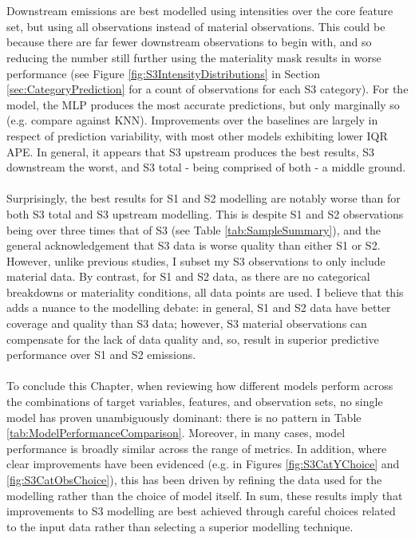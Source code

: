 \documentclass[12pt,twoside]{report}
\begin{document}
\\\\
Downstream emissions are best modelled using intensities over the core feature set, but using all observations instead of material observations. This could be because there are far fewer downstream observations to begin with, and so reducing the number still further using the materiality mask results in worse performance (see Figure \ref{fig:S3IntensityDistributions} in Section \ref{sec:CategoryPrediction} for a count of observations for each S3 category). For the model, the MLP produces the most accurate predictions, but only marginally so (e.g. compare against KNN). Improvements over the baselines are largely in respect of prediction variability, with most other models exhibiting lower IQR APE. In general, it appears that S3 upstream produces the best results, S3 downstream the worst, and S3 total - being comprised of both - a middle ground. 
\\\\
Surprisingly, the best results for S1 and S2 modelling are notably worse than for both S3 total and S3 upstream modelling. This is despite S1 and S2 observations being over three times that of S3 (see Table \ref{tab:SampleSummary}), and the general acknowledgement that S3 data is worse quality than either S1 or S2. However, unlike previous studies, I subset my S3 observations to only include material data. By contrast, for S1 and S2 data, as there are no categorical breakdowns or materiality conditions, all data points are used. I believe that this adds a nuance to the modelling debate: in general, S1 and S2 data have better coverage and quality than S3 data; however, S3 material observations can compensate for the lack of data quality and, so, result in superior predictive performance over S1 and S2 emissions. 
\\\\
To conclude this Chapter, when reviewing how different models perform across the combinations of target variables, features, and observation sets, no single model has proven unambiguously dominant: there is no pattern in Table \ref{tab:ModelPerformanceComparison}. Moreover, in many cases, model performance is broadly similar across the range of metrics. In addition, where clear improvements have been evidenced (e.g. in Figures \ref{fig:S3CatYChoice} and \ref{fig:S3CatObsChoice}), this has been driven by refining the data used for the modelling rather than the choice of model itself. In sum, these results imply that improvements to S3 modelling are best achieved through careful choices related to the input data rather than selecting a superior modelling technique.  
\end{document}
